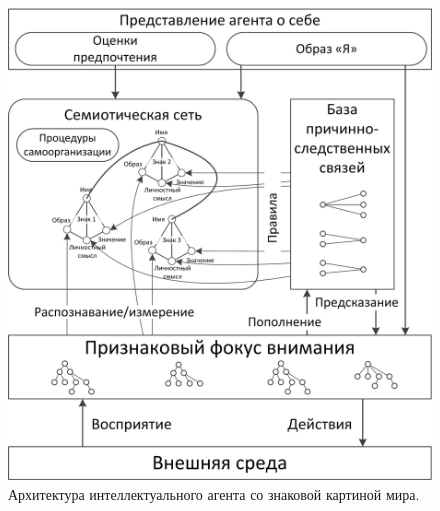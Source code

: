 \documentclass[a4paper, 12pt]{article}
\theoremstyle{plain}
\begin{document}
	\begin{figure}[p]
		\centering
		\includegraphics[width=0.7\linewidth]{iagent.jpg}
		\caption{Архитектура интеллектуального агента со знаковой картиной мира.}
		\label{fig:iagent}
	\end{figure}		
\end{document}
